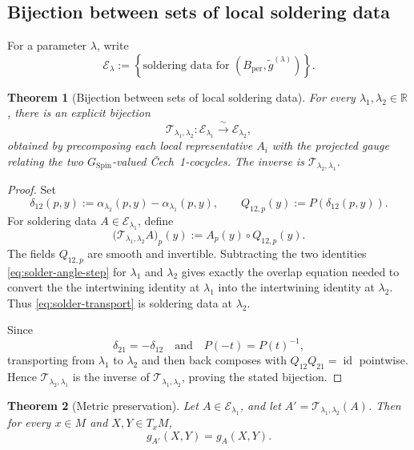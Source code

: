 \documentclass[11pt,a4paper]{article}
\newtheorem{theorem}{Theorem}[section]
\theoremstyle{definition}
\theoremstyle{remark}
\newcommand{\R}{\mathbb{R}}
\newcommand{\SpinG}{G_{\mathrm{Spin}}}
\newcommand{\id}{\operatorname{id}}
\newcommand{\Cech}{\ifmmode\text{\v{C}ech}\else\v{C}ech\fi}
\newcommand{\cE}{\mathcal{E}}
\begin{document}
\subsection{Bijection between sets of local soldering data}

For a parameter \(\lambda\), write
\[
   \cE_{\lambda}
   :=
   \left\{
      \text{soldering data for }
      (B_{\mathrm{per}},\widetilde g^{(\lambda)})
   \right\}.
\tag{11.8}
\]

\begin{theorem}[Bijection between sets of local soldering data]
\label{thm:solution-correspondence}
For every \(\lambda_{1},\lambda_{2}\in\R\), there is an explicit bijection
\[
   \mathcal T_{\lambda_{1},\lambda_{2}}:
   \cE_{\lambda_{1}}
   \xrightarrow{\;\sim\;}
   \cE_{\lambda_{2}},
\tag{11.9}\label{eq:solution-bijection}
\]
obtained by precomposing each local representative \(A_i\) with the projected
gauge relating the two \(\SpinG\)-valued \Cech\ 1-cocycles.  The inverse is
\(\mathcal T_{\lambda_{2},\lambda_{1}}\).
\end{theorem}

\begin{proof}
Set
\[
   \delta_{12}(p,y)
   :=\alpha_{\lambda_2}(p,y)-\alpha_{\lambda_1}(p,y),
   \qquad
   Q_{12,p}(y):=P(\delta_{12}(p,y)).
\tag{11.9a}\label{eq:gauge-angle}
\]
For soldering data \(A\in\cE_{\lambda_1}\), define
\[
   \bigl(\mathcal T_{\lambda_1,\lambda_2}A\bigr)_p(y)
   :=A_p(y)\circ Q_{12,p}(y).
\tag{11.9b}\label{eq:solder-transport}
\]
The fields \(Q_{12,p}\) are smooth and invertible.  Subtracting the two
identities \eqref{eq:solder-angle-step} for \(\lambda_1\) and
\(\lambda_2\) gives exactly the overlap equation needed to convert the
the intertwining identity at \(\lambda_1\) into the intertwining identity at \(\lambda_2\).  Thus
\eqref{eq:solder-transport} is soldering data at \(\lambda_2\).

Since
\[
   \delta_{21}=-\delta_{12}
   \quad\text{and}\quad
   P(-t)=P(t)^{-1},
\]
transporting from \(\lambda_1\) to \(\lambda_2\) and then back composes
with \(Q_{12}Q_{21}=\id\) pointwise.  Hence
\(\mathcal T_{\lambda_2,\lambda_1}\) is the inverse of
\(\mathcal T_{\lambda_1,\lambda_2}\), proving the stated bijection.
\end{proof}

\begin{theorem}[Metric preservation]
\label{thm:metric-preservation}
Let \(A\in\cE_{\lambda_{1}}\), and let
\(A'=\mathcal T_{\lambda_{1},\lambda_{2}}(A)\).
Then for every \(x\in M\) and \(X,Y\in T_xM\),
\[
   g_{A'}(X,Y)=g_A(X,Y).
\tag{11.10}
\]
\end{theorem}
\end{document}
